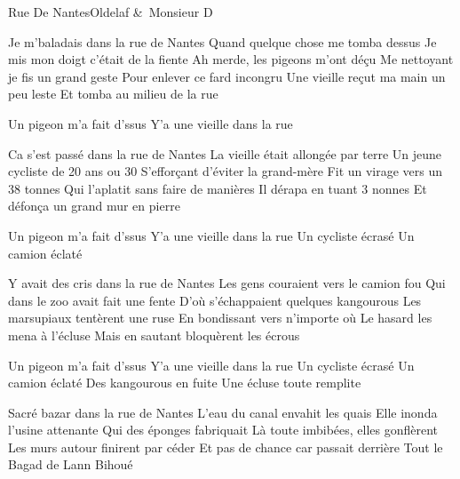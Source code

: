\documentclass[a4paper,11pt,french]{article}
\begin{document}
\begin{Song}{Rue De Nantes}{Oldelaf \&\ Monsieur D}
\begin{multicols}{2}
\begin{Verse}
Je m'baladais dans la rue de Nantes
Quand quelque chose me tomba dessus
Je mis mon doigt c'était de la fiente
Ah merde, les pigeons m'ont déçu
Me nettoyant je fis un grand geste
Pour enlever ce fard incongru
Une vieille reçut ma main un peu leste
Et tomba au milieu de la rue
\end{Verse}
\espaceInterStrophe

\begin{Chorus}
Un pigeon m'a fait d'ssus
Y'a une vieille dans la rue
\end{Chorus}
\espaceInterStrophe

\begin{Verse}
Ca s'est passé dans la rue de Nantes
La vieille était allongée par terre
Un jeune cycliste de 20 ans ou 30
S'efforçant d'éviter la grand-mère
Fit un virage vers un 38 tonnes
Qui l'aplatit sans faire de manières
Il dérapa en tuant 3 nonnes
Et défonça un grand mur en pierre
\end{Verse}
\espaceInterStrophe

\begin{Chorus}
Un pigeon m'a fait d'ssus
Y'a une vieille dans la rue
Un cycliste écrasé
Un camion éclaté
\end{Chorus}
\espaceInterStrophe

\begin{Verse}
Y avait des cris dans la rue de Nantes
Les gens couraient vers le camion fou
Qui dans le zoo avait fait une fente
D'où s'échappaient quelques kangourous
Les marsupiaux tentèrent une ruse
En bondissant vers n'importe où
Le hasard les mena à l'écluse
Mais en sautant bloquèrent les écrous
\end{Verse}
\espaceInterStrophe

\begin{Chorus}
Un pigeon m'a fait d'ssus
Y'a une vieille dans la rue
Un cycliste écrasé
Un camion éclaté
Des kangourous en fuite
Une écluse toute remplite
\end{Chorus}
\espaceInterStrophe

\begin{Verse}
Sacré bazar dans la rue de Nantes
L'eau du canal envahit les quais
Elle inonda l'usine attenante
Qui des éponges fabriquait
Là toute imbibées, elles gonflèrent
Les murs autour finirent par céder
Et pas de chance car passait derrière
Tout le Bagad de Lann Bihoué
\end{Verse}
\espaceInterStrophe


\end{multicols}
\end{Song}
\end{document}
